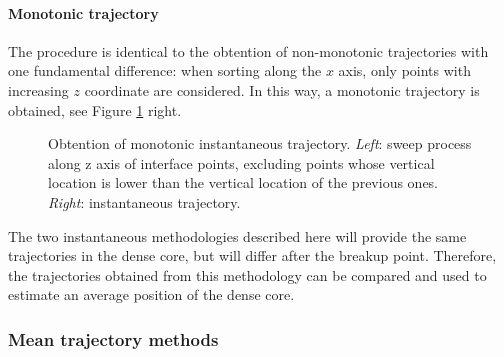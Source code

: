 \paragraph*{Monotonic trajectory} 

The procedure is identical to the obtention of non-monotonic trajectories with one fundamental difference: when sorting along the $x$ axis, only points with increasing $z$ coordinate are considered. In this way, a monotonic trajectory is obtained, see Figure \ref{fig:trajectory_obtention_instantaneous_method_b} right. 


\begin{figure}[ht]
     \centering
     \begin{subfigure}[b]{0.45\textwidth}
         \centering
     \end{subfigure}
     \begin{subfigure}[b]{0.45\textwidth}
         \centering
     \end{subfigure}
        \caption[Obtention of monotonic instantaneous trajectory]{Obtention of monotonic instantaneous trajectory. \textsl{Left}: sweep process along z axis of interface points, excluding points whose vertical location is lower than the vertical location of the previous ones. \textsl{Right}: instantaneous trajectory.}
        \label{fig:trajectory_obtention_instantaneous_method_b}
\end{figure}

The two instantaneous methodologies described here will provide the same trajectories in the dense core, but will differ after the breakup point. Therefore, the trajectories obtained from this methodology can be compared and used to estimate an average position of the dense core. 


\subsubsection{Mean trajectory methods}

